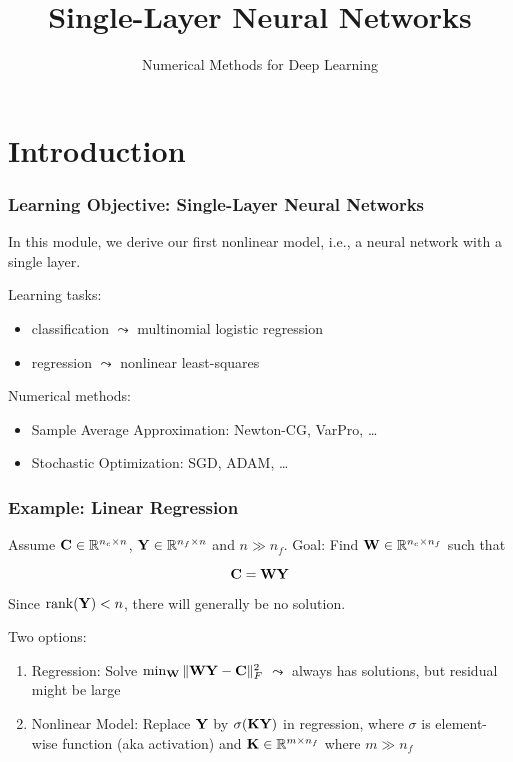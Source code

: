 \documentclass[12pt,fleqn,handout]{beamer}
\title{ Single-Layer Neural Networks}
\subtitle{Numerical Methods for Deep Learning}
\date{
}
\begin{document}
\makebeamertitle

\section{Introduction}



\begin{frame}
	\frametitle{Learning Objective: Single-Layer Neural Networks}
	
	In this module, we derive our first nonlinear model, i.e., a neural network with a single layer.
	
	\bigskip
	
	Learning tasks:
	\begin{itemize}
		\item classification $\leadsto$ multinomial logistic regression
		\item regression $ \leadsto$ nonlinear least-squares
	\end{itemize}
	
	\bigskip
	
	Numerical methods:
	\begin{itemize}
		\item Sample Average Approximation: Newton-CG, VarPro, \ldots
		\item Stochastic Optimization: SGD, ADAM, \ldots
	\end{itemize}
\end{frame}



\begin{frame}\frametitle{Example: Linear Regression}


Assume ${\bf C}\in \mathbb{R}^{n_c\times n}$, ${\bf Y} \in \mathbb{R}^{n_f \times n}$ and $n \gg n_f$.
Goal: Find ${\bf W} \in \mathbb{R}^{n_c \times n_f}$ such that

$$ {\bf C} = {\bf W} {\bf Y} $$

\bigskip
\pause

Since ${\rm rank}({\bf Y})<n$, there will generally be no solution.

\bigskip
\pause

Two options:
\begin{enumerate}
	\item Regression: Solve $\min_{\bf W} \| {\bf W} {\bf Y} - {\bf C} \|_F^2$ $\leadsto$ always has solutions, but residual might be large
	\item Nonlinear Model: Replace ${\bf Y}$ by $\sigma({\bf K}{\bf Y})$ in regression, where $\sigma$ is element-wise function (aka activation) and ${\bf K} \in \mathbb{R}^{m \times n_f}$ where $m \gg n_f$
\end{enumerate}

\end{frame}
\end{document}
